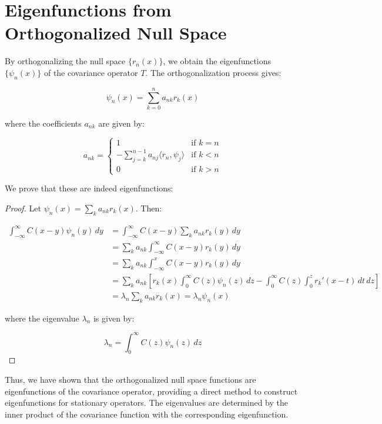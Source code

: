 \documentclass{article}
\begin{document}
\section{Eigenfunctions from Orthogonalized Null Space}

By orthogonalizing the null space $\{r_n(x)\}$, we obtain the eigenfunctions $\{\psi_n(x)\}$ of the covariance operator $T$. The orthogonalization process gives:

$$\psi_n(x) = \sum_{k=0}^n a_{nk} r_k(x)$$

where the coefficients $a_{nk}$ are given by:

$$a_{nk} = \begin{cases}
1 & \text{if } k = n \\
-\sum_{j=k}^{n-1} a_{nj} \langle r_n, \psi_j \rangle & \text{if } k < n \\
0 & \text{if } k > n
\end{cases}$$

We prove that these are indeed eigenfunctions:

\begin{proof}
Let $\psi_n(x) = \sum_k a_{nk} r_k(x)$. Then:

\begin{align*}
\int_{-\infty}^\infty C(x-y) \psi_n(y) \, dy &= \int_{-\infty}^\infty C(x-y) \sum_k a_{nk} r_k(y) \, dy \\
&= \sum_k a_{nk} \int_{-\infty}^\infty C(x-y) r_k(y) \, dy \\
&= \sum_k a_{nk} \int_{-\infty}^x C(x-y) r_k(y) \, dy \\
&= \sum_k a_{nk} \left[r_k(x) \int_0^\infty C(z) \psi_n(z) \, dz - \int_0^\infty C(z) \int_0^z r_k'(x-t) \, dt \, dz\right] \\
&= \lambda_n \sum_k a_{nk} r_k(x) = \lambda_n \psi_n(x)
\end{align*}

where the eigenvalue $\lambda_n$ is given by:

$$\lambda_n = \int_0^\infty C(z) \psi_n(z) \, dz$$
\end{proof}

Thus, we have shown that the orthogonalized null space functions are eigenfunctions of the covariance operator, providing a direct method to construct eigenfunctions for stationary operators. The eigenvalues are determined by the inner product of the covariance function with the corresponding eigenfunction.
\end{document}
